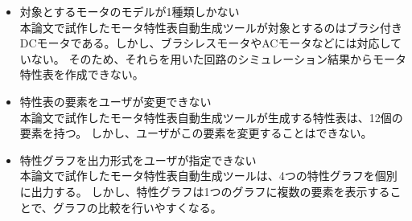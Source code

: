\documentclass[uplatex, 10pt, a4p]{jsarticle}
\begin{document}
\begin{itemize}
    \item 対象とするモータのモデルが1種類しかない\\
    本論文で試作したモータ特性表自動生成ツールが対象とするのはブラシ付きDCモータである。しかし、ブラシレスモータやACモータなどには対応していない。
    そのため、それらを用いた回路のシミュレーション結果からモータ特性表を作成できない。

\item 特性表の要素をユーザが変更できない\\
      本論文で試作したモータ特性表自動生成ツールが生成する特性表は、12個の要素を持つ。
      しかし、ユーザがこの要素を変更することはできない。

\item 特性グラフを出力形式をユーザが指定できない\\
      本論文で試作したモータ特性表自動生成ツールは、4つの特性グラフを個別に出力する。
      しかし、特性グラフは1つのグラフに複数の要素を表示することで、グラフの比較を行いやすくなる。


\end{itemize}



\footnotesize


\end{document}
